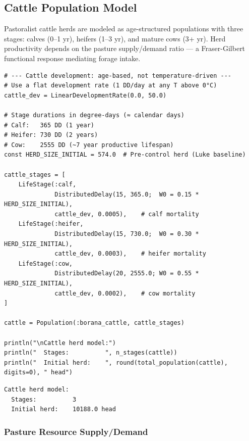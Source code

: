 \subsection{Cattle Population Model}



\label{7930354229164306730}{}


Pastoralist cattle herds are modeled as age-structured populations with three stages: calves (0–1 yr), heifers (1–3 yr), and mature cows (3+ yr). Herd productivity depends on the pasture supply/demand ratio — a Fraser-Gilbert functional response mediating forage intake.




\begin{verbatim}
# --- Cattle development: age-based, not temperature-driven ---
# Use a flat development rate (1 DD/day at any T above 0°C)
cattle_dev = LinearDevelopmentRate(0.0, 50.0)

# Stage durations in degree-days (≈ calendar days)
# Calf:   365 DD (1 year)
# Heifer: 730 DD (2 years)
# Cow:    2555 DD (~7 year productive lifespan)
const HERD_SIZE_INITIAL = 574.0  # Pre-control herd (Luke baseline)

cattle_stages = [
    LifeStage(:calf,
              DistributedDelay(15, 365.0;  W0 = 0.15 * HERD_SIZE_INITIAL),
              cattle_dev, 0.0005),    # calf mortality
    LifeStage(:heifer,
              DistributedDelay(15, 730.0;  W0 = 0.30 * HERD_SIZE_INITIAL),
              cattle_dev, 0.0003),    # heifer mortality
    LifeStage(:cow,
              DistributedDelay(20, 2555.0; W0 = 0.55 * HERD_SIZE_INITIAL),
              cattle_dev, 0.0002),    # cow mortality
]

cattle = Population(:borana_cattle, cattle_stages)

println("\nCattle herd model:")
println("  Stages:          ", n_stages(cattle))
println("  Initial herd:    ", round(total_population(cattle), digits=0), " head")
\end{verbatim}




\begin{verbatim}
Cattle herd model:
  Stages:          3
  Initial herd:    10188.0 head
\end{verbatim}



\subsubsection{Pasture Resource Supply/Demand}



